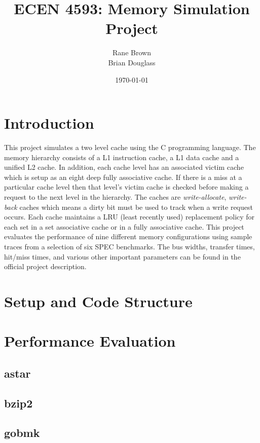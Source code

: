 \documentclass[11pt,titlepage]{article}
\author{Rane Brown \\ Brian Douglass}
\title{ECEN 4593: Memory Simulation Project}
\date{\today}
\begin{document}
\maketitle
\tableofcontents
\listoffigures
\listoftables
\newpage

\section{Introduction}
    This project simulates a two level cache using the C programming language. The memory hierarchy consists of a L1 instruction cache, a L1 data cache and a unified L2 cache. In addition, each cache level has an associated victim cache which is setup as an eight deep fully associative cache. If there is a miss at a particular cache level then that level's victim cache is checked before making a request to the next level in the hierarchy. The caches are \emph{write-allocate}, \emph{write-back} caches which means a dirty bit must be used to track when a write request occurs. Each cache maintains a LRU (least recently used) replacement policy for each set in a set associative cache or in a fully associative cache. This project evaluates the performance of nine different memory configurations using sample traces from a selection of six SPEC benchmarks. The bus widths, transfer times, hit/miss times, and various other important parameters can be found in the official project description.

\section{Setup and Code Structure}

\section{Performance Evaluation}

    \subsection{astar}

    \subsection{bzip2}

    \subsection{gobmk}
\end{document}
